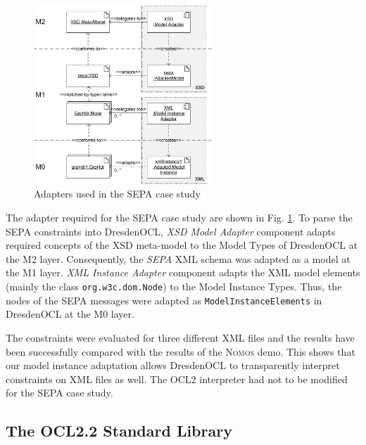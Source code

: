 \begin{figure}[!t]
	\centering
		\includegraphics[width=0.60\textwidth]{figures/casestudy02.pdf}
	\caption{Adapters used in the SEPA case study
	  }
	\label{fig:casestudy02}
\end{figure}

The adapter required for the SEPA case study are shown in Fig.
\ref{fig:casestudy02}. To parse the SEPA constraints
into DresdenOCL,  \textit{XSD Model Adapter} component  
adapts required concepts of the XSD meta-model to the Model 
Types of DresdenOCL at the M2 layer. 
Consequently, the \textit{SEPA} XML schema was adapted as a model at the M1 layer.
 \textit{XML Instance Adapter} component 
adapts the XML model elements (mainly the class \texttt{org.w3c.dom.Node}) to the Model Instance Types. 
Thus, the nodes of the SEPA messages
were adapted as \texttt{ModelInstanceElements} in DresdenOCL at the M0 layer.

The constraints were evaluated for three different XML files 
and the results have been successfully compared with the results of the \textsc{Nomos} demo.
This shows that our model instance adaptation allows DresdenOCL to transparently interpret
constraints on XML files as well. The OCL2 interpreter had not to be modified for the SEPA case study.


\subsection{The OCL2.2 Standard Library}

